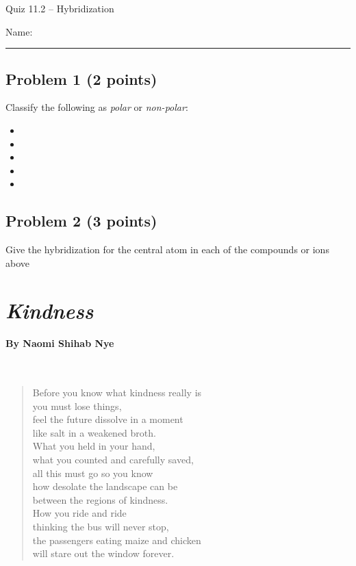 \documentclass[11pt, letterpaper]{memoir}
\begin{document}
	\begin{center}
		{\large	Quiz 11.2 -- Hybridization}
	\end{center}
{\large Name: \rule[-1mm]{4in}{.1pt}
	
	\subsection*{Problem 1 (2 points)}
	Classify the following as \emph{polar} or \emph{non-polar}:
	
	\begin{itemize}
		\item {}
		\item \vspace{3em} 
		\item \vspace{3em} 
		\item \vspace{3em} 
		\item \vspace{3em} 
	\end{itemize}

	\vspace{2.25em}
	\subsection*{Problem 2 (3 points)}
	Give the hybridization for the central atom in each of the compounds or ions above
\newpage
\pagestyle{empty}
\addtocounter{page}{-1}
\section*{\emph{Kindness}}
\paragraph{By Naomi Shihab Nye}~
\begin{verse}
	Before you know what kindness really is\\
	you must lose things,\\
	feel the future dissolve in a moment\\
	like salt in a weakened broth.\\
	What you held in your hand,\\
	what you counted and carefully saved,\\
	all this must go so you know\\
	how desolate the landscape can be\\
	between the regions of kindness.\\
	How you ride and ride\\
	thinking the bus will never stop,\\
	the passengers eating maize and chicken\\
	will stare out the window forever.


\end{verse}}
\end{document}
